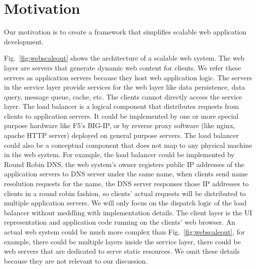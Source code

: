 \section{Motivation}
\label{sec:moti}

Our motivation is to create a framework that simplifies scalable web application
development.



\webscaleout{}

Fig.~\ref{fig:webscaleout} shows the architecture of a scalable web system.
The web layer are servers that generate dynamic web content for clients.
We refer these servers as application servers because they host web application
logic.
The servers in the service layer provide services for the web layer
like data persistence, data query, message queue, cache, etc. 
The clients cannot directly access the service layer.
The load balancer is a logical component that 
distributes requests from clients to application servers.
It could be implemented by one or more special purpose hardware like F5's BIG-IP,
or by reverse proxy software (like nginx, apache HTTP server) deployed on general
purpose servers.
The load balancer could also be a conceptual component that does not map to 
any physical machine in the web system.
For example, 
the load balancer could be implemented by Round Robin DNS,
the web system's owner registers public IP addresses of the application servers
to DNS server under the same name,
when clients send name resolution requests for the name,
the DNS server responses those IP addresses to clients in a round robin fashion,
so clients' actual requests will be distributed to multiple application servers.
We will only focus on the dispatch logic of the load balancer without meddling with
implementation details.
The client layer is the UI representation and application code running on the
clients' web browser.
An actual web system could be much more complex than Fig.~\ref{fig:webscaleout},
for example, there could be multiple layers inside the service layer,
there could be web servers that are dedicated to serve static resources.
We omit these details because they are not relevant to our discussion.

